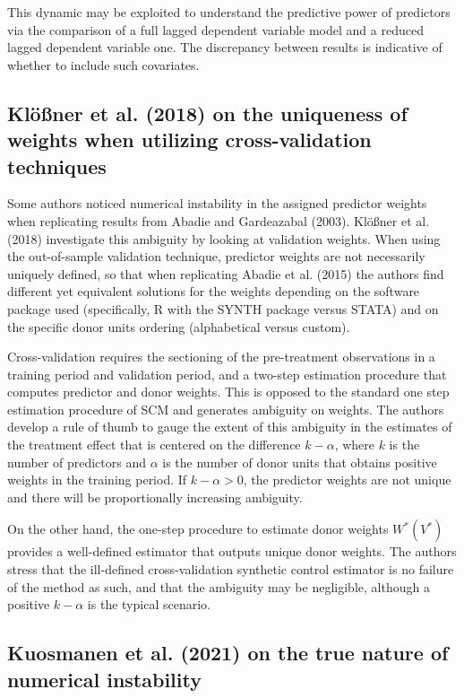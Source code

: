 \documentclass[12pt,a4paper,draft]{article}
\begin{document}
This dynamic may be exploited to understand the predictive power of predictors via the 
comparison of a full lagged dependent variable model and a reduced lagged dependent 
variable one. The discrepancy between results is indicative of whether to include 
such covariates.




\subsection{Klößner et al. (2018) on the uniqueness of weights when utilizing cross-validation techniques}

Some authors noticed numerical instability in the assigned predictor weights 
when replicating results from Abadie and Gardeazabal (2003). 
Klößner et al. (2018) investigate this ambiguity by looking at validation weights. 
When using the out-of-sample validation technique, 
predictor weights are not necessarily uniquely defined, so that when replicating 
Abadie et al. (2015) the authors find different yet equivalent solutions 
for the weights depending on the software package used (specifically, R with 
the SYNTH package versus STATA) and on the specific donor units ordering (alphabetical 
versus custom).

Cross-validation requires the sectioning of the pre-treatment observations 
in a training period and validation period, and a two-step estimation procedure 
that computes predictor and donor weights. This is opposed to the standard 
one step estimation procedure of SCM and generates ambiguity on weights. 
The authors develop a rule of thumb to gauge the extent of this ambiguity 
in the estimates of the treatment effect that is centered on the difference 
$k-\alpha$, where $k$ is the number of predictors and $\alpha$ is the number of 
donor units that obtains positive weights in the training period.
If $k-\alpha>0$, the predictor weights are not unique and there will be 
proportionally increasing ambiguity.

On the other hand, the one-step procedure to estimate donor weights $W^*(V^*)$ 
provides a well-defined estimator that outputs unique donor weights. The authors 
stress that the ill-defined cross-validation synthetic control estimator is no 
failure of the method as such, and that the ambiguity may be negligible, although 
a positive $k-\alpha$ is the typical scenario.




\subsection{Kuosmanen et al. (2021) on the true nature of numerical instability}
\end{document}
